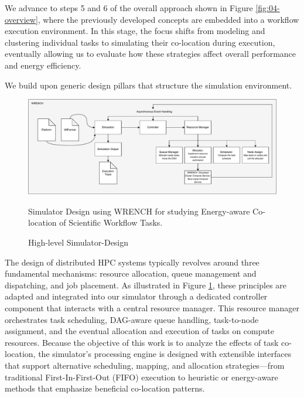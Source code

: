We advance to steps 5 and 6 of the overall approach shown in Figure \ref{fig:04-overview}, where the previously developed concepts are embedded into a workflow execution environment. In this stage, the focus shifts from modeling and clustering individual tasks to simulating their co-location during execution, eventually allowing us to evaluate how these strategies affect overall performance and energy efficiency.


\label{sec:design_pillars}
We build upon generic design pillars that structure the simulation environment.

\begin{figure}[H]
    \centering
    \includegraphics[scale=0.5]{fig/04/04-approach-sim.pdf}
    \small
    \caption{High-level Simulator-Design}
    \label{fig:04-sim-design}
    \tiny
    Simulator Design using WRENCH for studying Energy-aware Co-location of Scientific Workflow Tasks.
\end{figure}

The design of distributed HPC systems typically revolves around three fundamental mechanisms: resource allocation, queue management and dispatching, and job placement. As illustrated in Figure \ref{fig:04-sim-design}, these principles are adapted and integrated into our simulator through a dedicated controller component that interacts with a central resource manager. This resource manager orchestrates task scheduling, DAG-aware queue handling, task-to-node assignment, and the eventual allocation and execution of tasks on compute resources. Because the objective of this work is to analyze the effects of task co-location, the simulator's processing engine is designed with extensible interfaces that support alternative scheduling, mapping, and allocation strategies—from traditional First-In-First-Out (FIFO) execution to heuristic or energy-aware methods that emphasize beneficial co-location patterns.

